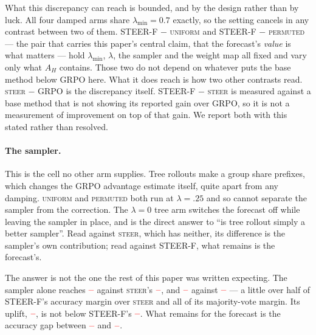 \documentclass[11pt]{article}
\newcommand{\AH}{A_{H}}
\providecommand{\PENDING}{\textcolor{red}{\textbf{--}}}
\newcommand{\num}[1]{\ifcsname #1\endcsname\csname #1\endcsname\else\PENDING\fi}
\begin{document}
What this discrepancy can reach is bounded, and by the design rather than by
luck. All four damped arms share $\lambda_{\min} = 0.7$ exactly, so the setting
cancels in any contrast between two of them. STEER-F $-$ \textsc{uniform} and STEER-F $-$
\textsc{permuted} --- the pair that carries this paper's central claim, that the
forecast's \emph{value} is what matters --- hold $\lambda_{\min}$, $\lambda$,
the sampler and the weight map all fixed and vary only what $\AH$ contains. Those
two do not depend on whatever puts the base method below GRPO here. What it does
reach is how two other contrasts read. \textsc{steer} $-$ GRPO is the discrepancy
itself. STEER-F $-$ \textsc{steer} is measured against a base method that is not
showing its reported gain over GRPO, so it is not a measurement of improvement on
top of that gain. We report both with this stated rather than resolved.

\paragraph{The sampler.} This is the cell no other arm supplies. Tree rollouts make a
group share prefixes, which changes the GRPO advantage estimate itself, quite apart
from any damping. \textsc{uniform} and \textsc{permuted} both run at $\lambda = .25$
and so cannot separate the sampler from the correction. The $\lambda = 0$ tree arm
switches the forecast off while leaving the sampler in place, and is the direct
answer to ``is tree rollout simply a better sampler''. Read against \textsc{steer},
which has neither, its difference is the sampler's own contribution; read against
STEER-F, what remains is the forecast's.

The answer is not the one the rest of this paper was written expecting. The sampler
alone reaches $\num{Rlamzeroacc}$ against \textsc{steer}'s $\num{Rsteeracc}$, and
$\num{Rlamzeromaj}$ against $\num{Rsteermaj}$ --- a little over half of STEER-F's
accuracy margin over \textsc{steer} and all of its majority-vote margin. Its uplift, $\num{Rlamzerouplift}$, is not below STEER-F's
$\num{Rsigneduplift}$. What remains for the forecast is the accuracy gap between
$\num{Rlamzeroacc}$ and $\num{Rsignedacc}$.
\end{document}
